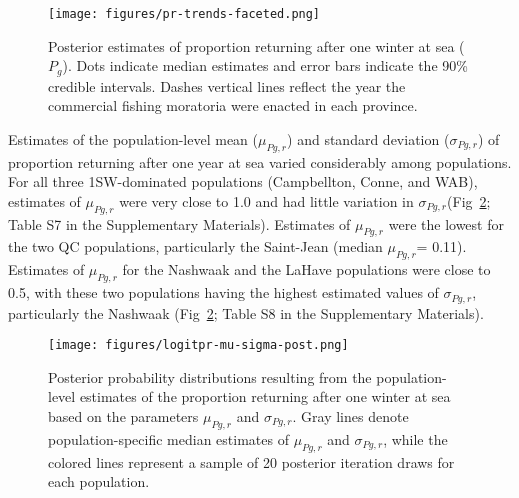 \documentclass[12pt]{article}
\newcommand{\Pg}{$P_g$\xspace}
\newcommand{\prmu}{$\mu_{Pg,r}$\xspace}
\newcommand{\prsig}{$\sigma_{Pg,r}$\xspace}
\begin{document}
\begin{figure}[htbp] \centering
    \texttt{[image: figures/pr-trends-faceted.png]}
    \caption{Posterior estimates of proportion returning after one winter at sea (\Pg).
 Dots indicate median estimates and error
        bars indicate the 90\% credible intervals. Dashes vertical lines reflect the year the commercial fishing moratoria were enacted
    in each province.} \label{fig:pr-faceted} 
\end{figure}

Estimates of the population-level mean (\prmu) and standard deviation (\prsig) of proportion returning after one year at sea varied considerably among populations. 
For all
three 1SW-dominated populations (Campbellton, Conne, and WAB), estimates of \prmu
were very close to 1.0 and had little variation in \prsig (Fig~\ref{fig:prmu-post}; Table S7 in the Supplementary Materials).
Estimates of \prmu were the lowest for the two QC populations, particularly the Saint-Jean (median \prmu = 0.11).
Estimates of \prmu for the Nashwaak and the LaHave populations were close to 0.5, with these two populations having 
the highest estimated values of \prsig, particularly the Nashwaak (Fig~\ref{fig:prmu-post};  Table S8 in the Supplementary Materials).

% 

% 



\begin{figure}[htbp] \centering
    \texttt{[image: figures/logitpr-mu-sigma-post.png]}
    \caption{Posterior probability distributions resulting from the population-level estimates of the proportion returning after one winter at sea based on
        the parameters \prmu and \prsig. Gray lines denote population-specific median estimates of \prmu and \prsig, while
       the colored lines represent a sample of 20 posterior iteration draws for each population.} 
   \label{fig:prmu-post} 
\end{figure}
\end{document}

